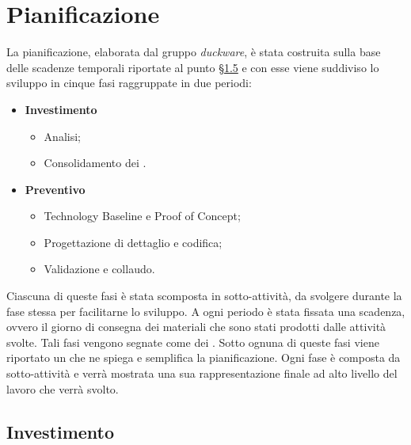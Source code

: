 \clearpage
\section{Pianificazione}
\label{sec:pianificazione}
La pianificazione, elaborata dal gruppo \emph{duckware}, è stata costruita sulla base delle scadenze temporali riportate al punto \hyperlink{scadenze}{§1.5} e con esse viene suddiviso lo sviluppo in cinque fasi raggruppate in due periodi:
\begin{itemize}
	\item \textbf{Investimento}
		\begin{itemize}
			\item Analisi;
			\item Consolidamento dei .
		\end{itemize}
	\item \textbf{Preventivo}
	\begin{itemize}
		\item Technology Baseline e Proof of Concept;
		\item Progettazione di dettaglio e codifica;
		\item Validazione e collaudo.
	\end{itemize}
\end{itemize}
Ciascuna di queste fasi è stata scomposta in sotto-attività, da svolgere durante la fase stessa per facilitarne lo sviluppo. A ogni periodo è stata fissata una scadenza, ovvero il giorno di consegna dei materiali che sono stati prodotti dalle attività svolte. Tali fasi vengono segnate come  dei . Sotto ognuna di queste fasi viene riportato un  che ne spiega e semplifica la pianificazione. Ogni fase è composta da sotto-attività e verrà mostrata una sua rappresentazione finale ad alto livello del lavoro che verrà svolto.
\subsection{Investimento}
\label{sec:investimento}

